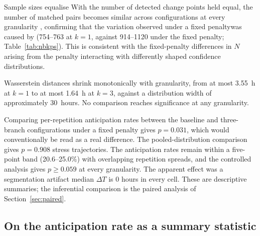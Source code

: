 \documentclass[preprint,12pt,authoryear]{elsarticle}
\newcommand{\dt}{$\Delta T$}
\providecommand{\DIFaddtex}[1]{{\protect\color{blue} \sf #1}} %
\providecommand{\DIFdeltex}[1]{{\protect\color{red} \scriptsize #1}} %
\providecommand{\DIFaddbegin}{} %
\providecommand{\DIFaddend}{} %
\providecommand{\DIFdelbegin}{} %
\providecommand{\DIFdelend}{} %
\providecommand{\DIFadd}[1]{\texorpdfstring{\DIFaddtex{#1}}{#1}} %
\providecommand{\DIFdel}[1]{\texorpdfstring{\DIFdeltex{#1}}{}} %
\newcommand{\DIFscaledelfig}{0.5}
\newlength{\DIFdelgraphicswidth} %
\newlength{\DIFdelgraphicsheight} %
\newcommand{\DIFaddincludegraphics}[2][]{{\color{blue}\fbox{\DIFOincludegraphics[#1]{#2}}}} %
\newcommand{\DIFdelincludegraphics}[2][]{%
\sbox{\DIFdelgraphicsbox}{\DIFOincludegraphics[#1]{#2}}%
\settoboxwidth{\DIFdelgraphicswidth}{\DIFdelgraphicsbox} %
\settoboxtotalheight{\DIFdelgraphicsheight}{\DIFdelgraphicsbox} %
\scalebox{\DIFscaledelfig}{%
\parbox[b]{\DIFdelgraphicswidth}{\usebox{\DIFdelgraphicsbox}\\[-\baselineskip] \rule{\DIFdelgraphicswidth}{0em}}\llap{\resizebox{\DIFdelgraphicswidth}{\DIFdelgraphicsheight}{%
\setlength{\unitlength}{\DIFdelgraphicswidth}%
\begin{picture}(1,1)%
\thicklines\linethickness{2pt} %
{\color[rgb]{1,0,0}\put(0,0){\framebox(1,1){}}}%
{\color[rgb]{1,0,0}\put(0,0){\line( 1,1){1}}}%
{\color[rgb]{1,0,0}\put(0,1){\line(1,-1){1}}}%
\end{picture}%
}\hspace*{3pt}}} %
} %
\DeclareRobustCommand{\DIFaddbegin}{\DIFOaddbegin \let\includegraphics\DIFaddincludegraphics} %
\DeclareRobustCommand{\DIFaddend}{\DIFOaddend \let\includegraphics\DIFOincludegraphics} %
\DeclareRobustCommand{\DIFdelbegin}{\DIFOdelbegin \let\includegraphics\DIFdelincludegraphics} %
\DeclareRobustCommand{\DIFdelend}{\DIFOaddend \let\includegraphics\DIFOincludegraphics} %
\begin{document}
\DIFdelbegin %
\DIFdel{Sample sizes equalise }\DIFdelend \DIFaddbegin \DIFadd{With the number of detected change points held equal, the number of
matched pairs becomes similar }\DIFaddend across configurations at every
granularity \DIFdelbegin \DIFdel{, confirming that the variation
observed under a fixed
penaltywas caused by }\DIFdelend \DIFaddbegin \DIFadd{(754--763 at $k=1$, against 914--1120 under the fixed
penalty; Table~\ref{tab:nbkps}). This is consistent with the
fixed-penalty differences in $N$ arising from }\DIFaddend the penalty interacting
with differently shaped \DIFdelbegin \DIFdel{confidence distributions.
}%

\DIFdel{Wasserstein distances shrink
monotonically with granularity, from at most 3.55~h at $k=1$ to at
most 1.64~h at $k=3$, against a distribution width of approximately
30~hours. No comparison reaches significance at any granularity. }%

\DIFdel{Comparing per-repetition
anticipation rates between the baseline and three-branch configurations
under a fixed penalty gives $p = 0.031$, which would conventionally
be read as a real difference. The pooled-distribution comparison gives
$p = 0.908$}\DIFdelend \DIFaddbegin \DIFadd{stress trajectories. The anticipation rates remain within
a five-point band (20.6--25.0\%) with overlapping repetition spreads}\DIFaddend ,
and the \DIFdelbegin \DIFdel{controlled analysis gives $p \geq 0.059$ at every granularity. The apparent effect was a segmentation artifact}\DIFdelend \DIFaddbegin \DIFadd{median \dt{} is 0 hours in every cell. These are descriptive
summaries; the inferential comparison is the paired analysis of
Section~\ref{sec:paired}}\DIFaddend .

\subsection{On the anticipation rate as a summary statistic}
\DIFaddbegin \label{sec:antrate}
\DIFaddend 
\end{document}
